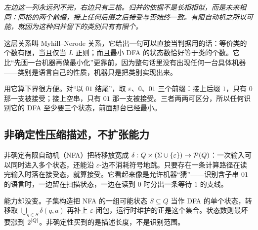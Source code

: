 \begin{center}

\emph{左边这一列永远列不完，右边只有三格。归并的依据不是长相相似，而是未来相同：同格的两个前缀，接上任何后缀之后接受与否始终一致。有限自动机之所以可能，就因为这种归并留下的类别只有有限个。}
\end{center}

这层关系叫 Myhill--Nerode 关系，它给出一句可以直接当判据用的话：等价类的个数有限，当且仅当 \(L\) 正则；而且最小 DFA 的状态数恰好等于类的个数。它比``先画一台机器再做最小化''更靠前，因为整句话里没有出现任何一台具体机器——类别是语言自己的性质，机器只是把类别实现出来。

用它算下界很方便。对``以 \(01\) 结尾''，取 \(\varepsilon\)、\(0\)、\(01\) 三个前缀：接上后缀 \(1\)，只有 \(0\) 那一支被接受；接上空串，只有 \(01\) 那一支被接受。三者两两可区分，所以任何识别它的 DFA 至少要三个状态，前面那台已经最小。

\subsection{非确定性压缩描述，不扩张能力}

非确定有限自动机（NFA）把转移放宽成 \(\delta:Q\times(\Sigma\cup\left\{\varepsilon\right\})\to\mathcal P(Q)\)：一次输入可以同时进入多个状态，还能沿 \(\varepsilon\)-边不消耗符号地跳。只要存在一条计算路径在读完输入时落在接受态，就算接受。它看起来像是允许机器``猜''——识别含子串 \(01\) 的语言时，一边留在扫描状态，一边在读到 \(0\) 时分出一条等待 \(1\) 的支线。

能力却没变。子集构造把 NFA 的一组可能状态 \(S\subseteq Q\) 当作 DFA 的单个状态，转移取 \(\bigcup_{q\in S}\delta(q,a)\) 再补上 \(\varepsilon\)-闭包，运行时维护的正是这个集合。状态数则最坏要涨到 \(2^{\left|Q\right|}\)。非确定性买到的是描述长度，不是识别范围。

